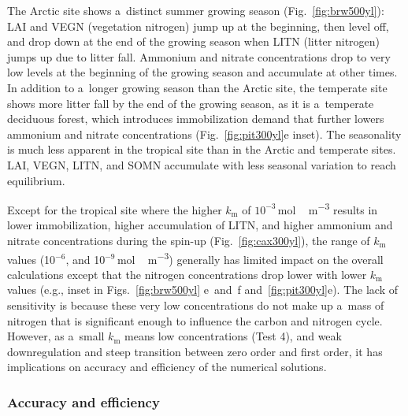 \documentclass[gmdd, online, hvmath]{copernicus}
\begin{document}
      The Arctic site shows a~distinct summer growing season
      (Fig.~\ref{fig:brw500yl}): LAI and VEGN (vegetation nitrogen) jump up
      at the beginning, then level off, and drop down at the end of the
      growing season when LITN (litter nitrogen) jumps up due to litter
      fall.  Ammonium and nitrate concentrations drop to very low levels at
      the beginning of the growing season and accumulate at other times. In
      addition to a~longer growing season than the Arctic site, the
      temperate site shows more litter fall by the end of the growing
      season, as it is a~temperate deciduous forest, which introduces
      immobilization demand that further lowers ammonium and nitrate
      concentrations (Fig.~\ref{fig:pit300yl}e inset). The seasonality is
      much less apparent in the tropical site than in the Arctic and
      temperate sites. LAI, VEGN, LITN, and SOMN accumulate with less
      seasonal variation to reach equilibrium.

      Except for the tropical site where the higher $k_\mathrm{m}$ of
      $10^{-3}$\,\unit{mol\,m^{-3}} results in lower immobilization, higher
      accumulation of LITN, and higher ammonium and nitrate concentrations
      during the spin-up (Fig.~\ref{fig:cax300yl}), the range of
      $k_\mathrm{m}$ values (10$^{-6}$, and 10$^{-9}$\,\unit{mol\,m^{-3}})
      generally has limited impact on the overall calculations except that
      the nitrogen concentrations drop lower with lower $k_\mathrm{m}$
      values (e.g., inset in Figs.~\ref{fig:brw500yl} e~and~f
      and~\ref{fig:pit300yl}e). The lack of sensitivity is because these
      very low concentrations do not make up a~mass of nitrogen that is
      significant enough to influence the carbon and nitrogen cycle.
      However, as a~small $k_\mathrm{m}$ means low concentrations (Test 4),
      and weak downregulation and steep transition between zero order and
      first order, it has implications on accuracy and efficiency of the
      numerical solutions.



\subsubsection{Accuracy and efficiency}%
\end{document}
